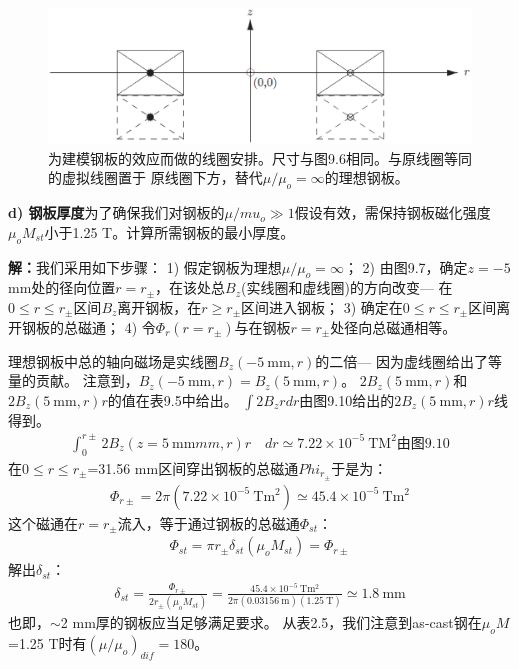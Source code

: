 \begin{figure}
	\centering
	\includegraphics[scale=0.6]{chpt9/figs/fig9.9.eps}
	\caption{为建模钢板的效应而做的线圈安排。尺寸与图9.6相同。与原线圈等同的虚拟线圈置于
	原线圈下方，替代$\mu/\mu_o=\infty$的理想钢板。}
\end{figure}

\textbf{d) 钢板厚度}\qquad 为了确保我们对钢板的$\mu/mu_o\gg 1$假设有效，需保持钢板磁化强度$\mu_o M_{st}$小于1.25 T。计算所需钢板的最小厚度。

\textbf{解：}我们采用如下步骤：
1) 假定钢板为理想$\mu/\mu_o=\infty$；
2) 由图9.7，确定$z=-5$ mm处的径向位置$r=r_{\pm}$，在该处总$B_z$(实线圈和虚线圈)的方向改变---
在$0\le r\le r_{\pm}$区间$B_z$离开钢板，在$r\ge r_{\pm}$区间进入钢板；
3) 确定在$0\le r\le r_{\pm}$区间离开钢板的总磁通；
4) 令$\Phi_r(r=r_{\pm})$与在钢板$r=r_{\pm}$处径向总磁通相等。

理想钢板中总的轴向磁场是实线圈$B_z(-5\ \mathrm{mm},r)$的二倍---
因为虚线圈给出了等量的贡献。
注意到，$B_z(-5\ \mathrm{mm},r)=B_z(5\ \mathrm{mm},r)$。
$2 B_z(5\ \mathrm{mm},r)$和$2 B_z(5\ \mathrm{mm},r)r$的值在表9.5中给出。
$\int 2B_z rdr$由图9.10给出的$2B_z(5\ \mathrm{mm},r)r$线得到。
\begin{align*}%
\int_{0}^{r\pm}2B_{z}(z=5\ \mathrm{mm}mm,r)r\quad dr\simeq 7.22\times10^{-5}\ \mathrm{TM^{2}}\mbox{由图9.10}
\end{align*}
在$0\le r\le r_{\pm}$=31.56 mm区间穿出钢板的总磁通$Phi_{r_{\pm}}$于是为：
\begin{align*}%
\Phi_{r\pm}=2\pi(7.22\times 10^{-5}\ \mathrm{Tm^{2}})\simeq 45.4\times 10^{-5}\ \mathrm{Tm^{2}}
\end{align*}
这个磁通在$r=r_{\pm}$流入，等于通过钢板的总磁通$\Phi_{st}$：
\begin{align*}%
\Phi_{st}=\pi r_{\pm}\delta_{st}(\mu_{o}M_{st})=\Phi_{r\pm}
\end{align*}
解出$\delta_{st}$：
\begin{align*}%
\delta_{st}=\frac{\Phi_{r\pm}}{2r_{\pm}(\mu_{o}M_{st})}=\frac{45.4\times 10^{-5}\ \mathrm{Tm^{2}}}{2\pi(0.03156\ \mathrm{m})(1.25\ \mathrm{T})}\simeq 1.8\ \mathrm{mm}
\end{align*}
也即，$\sim$2 mm厚的钢板应当足够满足要求。
从表2.5，我们注意到as-cast钢在$\mu_o M$=1.25 T时有$(\mu/\mu_o)_{dif}=180$。

